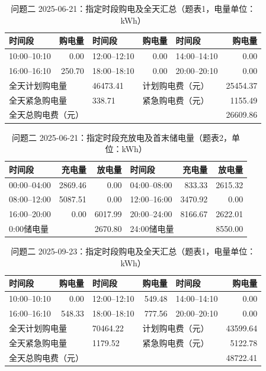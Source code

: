 \FloatBarrier
\begin{table}[H]
\centering\footnotesize
\setlength{\tabcolsep}{4pt}
\caption{问题二 2025-06-21：指定时段购电及全天汇总（题表1，电量单位：kWh）}
\label{tab:required-q2-2025-06-21-grid}
\begin{tabular}{@{}lrlrlr@{}}
\toprule
时间段 & 购电量 & 时间段 & 购电量 & 时间段 & 购电量 \\
\midrule
10:00--10:10 & 0.00 & 12:00--12:10 & 0.00 & 14:00--14:10 & 0.00 \\
16:00--16:10 & 250.70 & 18:00--18:10 & 0.00 & 20:00--20:10 & 0.00 \\
\multicolumn{2}{l}{全天计划购电量} & 46473.41 & \multicolumn{2}{l}{计划购电费（元）} & 25454.37 \\
\multicolumn{2}{l}{全天紧急购电量} & 338.71 & \multicolumn{2}{l}{紧急购电费（元）} & 1155.49 \\
\multicolumn{5}{l}{全天总购电费（元）} & 26609.86 \\
\bottomrule
\end{tabular}
\end{table}

\begin{table}[H]
\centering\footnotesize
\setlength{\tabcolsep}{4pt}
\caption{问题二 2025-06-21：指定时段充放电及首末储电量（题表2，单位：kWh）}
\label{tab:required-q2-2025-06-21-storage}
\begin{tabular}{@{}lrrlrr@{}}
\toprule
时间段 & 充电量 & 放电量 & 时间段 & 充电量 & 放电量 \\
\midrule
00:00--04:00 & 2869.46 & 0.00 & 04:00--08:00 & 833.33 & 2615.32 \\
08:00--12:00 & 5087.51 & 0.00 & 12:00--16:00 & 3470.92 & 0.00 \\
16:00--20:00 & 0.00 & 6017.99 & 20:00--24:00 & 8166.67 & 2622.01 \\
\multicolumn{2}{l}{0:00储电量} & 2670.80 & \multicolumn{2}{l}{24:00储电量} & 8550.00 \\
\bottomrule
\end{tabular}
\end{table}

\FloatBarrier
\begin{table}[H]
\centering\footnotesize
\setlength{\tabcolsep}{4pt}
\caption{问题二 2025-09-23：指定时段购电及全天汇总（题表1，电量单位：kWh）}
\label{tab:required-q2-2025-09-23-grid}
\begin{tabular}{@{}lrlrlr@{}}
\toprule
时间段 & 购电量 & 时间段 & 购电量 & 时间段 & 购电量 \\
\midrule
10:00--10:10 & 0.00 & 12:00--12:10 & 549.48 & 14:00--14:10 & 0.00 \\
16:00--16:10 & 548.33 & 18:00--18:10 & 777.56 & 20:00--20:10 & 0.00 \\
\multicolumn{2}{l}{全天计划购电量} & 70464.22 & \multicolumn{2}{l}{计划购电费（元）} & 43599.64 \\
\multicolumn{2}{l}{全天紧急购电量} & 1179.52 & \multicolumn{2}{l}{紧急购电费（元）} & 5122.78 \\
\multicolumn{5}{l}{全天总购电费（元）} & 48722.41 \\
\bottomrule
\end{tabular}
\end{table}

